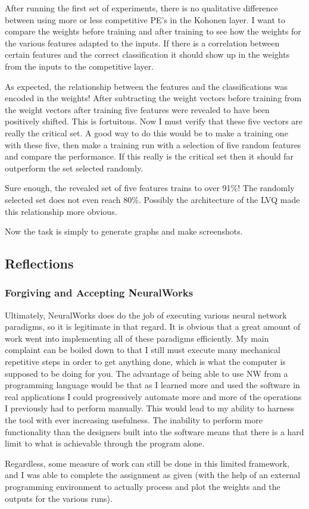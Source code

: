 \documentclass[12pt]{article}
\begin{document}
After running the first set of experiments, there is no qualitative difference between using more or less competitive PE's in the Kohonen layer.  I want to compare the weights before training and after training to see how the weights for the various features adapted to the inputs.  If there is a correlation between certain features and the correct classification it should show up in the weights from the inputs to the competitive layer.

As expected, the relationship between the features and the classifications was encoded in the weights!  After subtracting the weight vectors before training from the weight vectors after training five features were revealed to have been positively shifted.  This is fortuitous.  Now I must verify that these five vectors are really the critical set.  A good way to do this would be to make a training one with these five, then make a training run with a selection of five random features and compare the performance.  If this really is the critical set then it should far outperform the set selected randomly.  

Sure enough, the revealed set of five features trains to over 91\%!  The randomly selected set does not even reach 80\%.  Possibly the architecture of the LVQ made this relationship more obvious.  

Now the task is simply to generate graphs and make screenshots.

\subsection{Reflections}

\subsubsection{Forgiving and Accepting NeuralWorks}

Ultimately, NeuralWorks does do the job of executing various neural network paradigms, so it is legitimate in that regard.  It is obvious that a great amount of work went into implementing all of these paradigms efficiently.  My main complaint can be boiled down to that I still must execute many mechanical repetitive steps in order to get anything done, which is what the computer is supposed to be doing for you.  The advantage of being able to use NW from a programming language would be that as I learned more and used the software in real applications I could progressively automate more and more of the operations I previously had to perform manually.  This would lead to my ability to harness the tool with ever increasing usefulness.  The inability to perform more functionality than the designers built into the software means that there is a hard limit to what is achievable through the program alone.  

Regardless, some measure of work can still be done in this limited framework, and I was able to complete the assignment as given (with the help of an external programming environment to actually process and plot the weights and the outputs for the various runs).  
\end{document}
